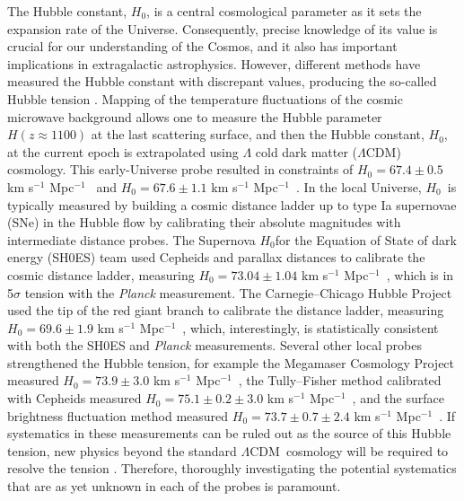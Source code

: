 \documentclass[longauth]{aa}
\newcommand{\ho}{$H_0$}
\newcommand{\lcdm}{$\Lambda$CDM}
\newcommand{\hunit}{km s$^{-1}$ Mpc$^{-1}$}
\newcommand{\ajsiv}[1]{{{#1}}}
\begin{document}
The Hubble constant, \ho, is a central cosmological parameter as it sets the expansion rate of the Universe. Consequently, precise knowledge of its value is crucial for our understanding of the Cosmos, and it also has important implications in extragalactic astrophysics. However, different methods have measured the Hubble constant with \ajsiv{discrepant} values, producing the so-called Hubble tension \citep[e.g.][]{Freedman21}. Mapping of the temperature fluctuations of the cosmic microwave background allows one to measure the Hubble parameter $H(z\approx1100)$ at the last scattering surface, and then the Hubble constant, \ho, at the current epoch is extrapolated using $\Lambda$ cold dark matter (\lcdm) cosmology. This early-Universe probe resulted in constraints of $H_0 = 67.4 \pm 0.5$ \hunit\ \citep{PlanckCollaboration18} and $H_0 = 67.6 \pm 1.1$ \hunit\ \citep{Aiola20}. In the local Universe, \ho\ is typically measured by building a cosmic distance ladder up to type Ia supernovae (SNe) in the Hubble flow by calibrating their absolute magnitudes with intermediate distance probes. The Supernova \ho for the Equation of State of dark energy (SH0ES) team used Cepheids and parallax distances to calibrate the cosmic distance ladder, measuring $H_0 = 73.04 \pm 1.04$ \hunit\ \citep{Riess22}, which is in 5$\sigma$ tension with the \textit{Planck} measurement. The Carnegie--Chicago Hubble Project used the tip of the red giant branch to calibrate the distance ladder, measuring $H_0 = 69.6 \pm 1.9$ \hunit\ \citep{Freedman19, Freedman20}, which, interestingly, is statistically consistent with both the SH0ES and \textit{Planck} measurements. Several other local probes strengthened the Hubble tension, for example the Megamaser Cosmology Project measured $H_0 = 73.9 \pm 3.0$ \hunit\ \citep{Pesce20}, the Tully--Fisher method calibrated with Cepheids measured $H_0 = 75.1 \pm 0.2 \pm 3.0$ \hunit\ \citep{Kourkchi20}, and the surface brightness fluctuation method measured $H_0 = 73.7 \pm 0.7 \pm 2.4$ \hunit\ \citep{Blakeslee21}. If systematics in these measurements can be ruled out as the source of this Hubble tension, new physics beyond the standard \lcdm\ cosmology will be required to resolve the tension \citep[e.g.][]{Poulin19, Knox20, Efstathiou21}. Therefore, thoroughly investigating the potential systematics that are as yet unknown in each of the probes is paramount.
\end{document}
